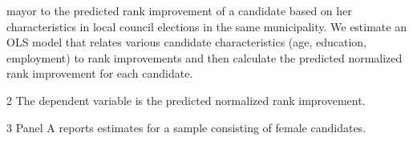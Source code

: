 \begin{table}[H]
\begin{center}
{\begin{threeparttable}
\begin{tablenotes}
\begin{small}
mayor
to
the
predicted
rank
improvement
of
a
candidate
based
on
her
characteristics
in
local
council
elections
in
the
same
municipality.
We
estimate
an
OLS
model
that
relates
various
candidate
characteristics
(age,
education,
employment)
to
rank
improvements
and
then
calculate
the
predicted
normalized
rank
improvement
for
each
candidate.
\item[2]
The
dependent
variable
is
the
predicted
normalized
rank
improvement.
\item[3]
Panel
A
reports
estimates
for
a
sample
consisting
of
female
candidates.
\end{small}
\end{tablenotes} \end{threeparttable} } \end{center} \end{table}

